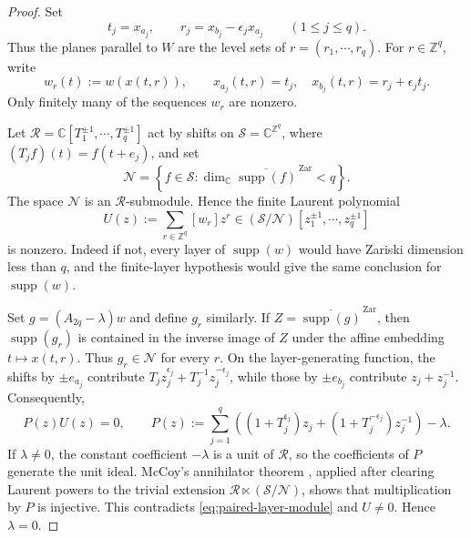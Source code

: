 \documentclass[11pt,reqno]{amsart}
\newcommand\Z{\ensuremath{\mathbb{Z}}}
\newcommand\C{\ensuremath{\mathbb{C}}}
\newcommand{\supp}{\operatorname{supp}}
\theoremstyle{definition}
\theoremstyle{plain}
\numberwithin{equation}{section}
\begin{document}
\begin{proof}
Set
\begin{equation*}
    t_j=x_{a_j},\qquad r_j=x_{b_j}-\epsilon_jx_{a_j}\qquad (1\le j\le q).
\end{equation*}
Thus the planes parallel to $W$ are the level sets of $r=(r_1,\cdots,r_q)$. For $r\in\Z^q$, write
\begin{equation*}
    w_r(t):=w(x(t,r)),\qquad x_{a_j}(t,r)=t_j,\quad x_{b_j}(t,r)=r_j+\epsilon_jt_j.
\end{equation*}
Only finitely many of the sequences $w_r$ are nonzero.

Let $\mathcal R=\C[T_1^{\pm1},\cdots,T_q^{\pm1}]$ act by shifts on $\mathscr S=\C^{\Z^q}$, where $(T_jf)(t)=f(t+e_j)$, and set
\begin{equation*}
    \mathscr N=\left\{f\in\mathscr S:\dim_{\C}\overline{\supp(f)}^{\,\mathrm{Zar}}<q\right\}.
\end{equation*}
The space $\mathscr N$ is an $\mathcal R$-submodule. Hence the finite Laurent polynomial
\begin{equation*}
    U(z):=\sum_{r\in\Z^q}[w_r]z^r
    \in(\mathscr S/\mathscr N)[z_1^{\pm1},\cdots,z_q^{\pm1}]
\end{equation*}
is nonzero. Indeed if not, every layer of $\supp(w)$ would have Zariski dimension less than $q$, and the finite-layer hypothesis would give the same conclusion for $\supp(w)$.

Set $g=(A_{2q}-\lambda)w$ and define $g_r$ similarly. If $Z=\overline{\supp(g)}^{\,\mathrm{Zar}}$, then $\supp(g_r)$ is contained in the inverse image of $Z$ under the affine embedding $t\mapsto x(t,r)$. Thus $g_r\in\mathscr N$ for every $r$. On the layer-generating function, the shifts by $\pm e_{a_j}$ contribute $T_jz_j^{\epsilon_j}+T_j^{-1}z_j^{-\epsilon_j}$, while those by $\pm e_{b_j}$ contribute $z_j+z_j^{-1}$. Consequently,
\begin{equation}\label{eq:paired-layer-module}
    P(z)U(z)=0,\qquad
    P(z):=\sum_{j=1}^q\left((1+T_j^{\epsilon_j})z_j+(1+T_j^{-\epsilon_j})z_j^{-1}\right)-\lambda.
\end{equation}
If $\lambda\ne0$, the constant coefficient $-\lambda$ is a unit of $\mathcal R$, so the coefficients of $P$ generate the unit ideal. McCoy's annihilator theorem \cite{McCoy1957}, applied after clearing Laurent powers to the trivial extension $\mathcal R\ltimes(\mathscr S/\mathscr N)$, shows that multiplication by $P$ is injective. This contradicts \eqref{eq:paired-layer-module} and $U\ne0$. Hence $\lambda=0$.
\end{proof}
\end{document}
